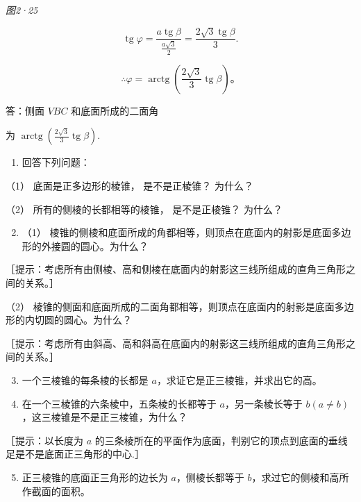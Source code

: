 \emph{图2·25}

\[
\operatorname{tg} \varphi = \frac {a \operatorname{tg} \beta}{\frac {a \sqrt {3}}{2}} = \frac {2 \sqrt {3} \operatorname{tg} \beta}{3}.
\]

\[
\therefore \varphi = \operatorname{arctg} \left(\frac {2 \sqrt {3}}{3} \operatorname{tg} \beta\right)\text{。}
\]

答：侧面 \(VBC\) 和底面所成的二面角

为
\(\operatorname{arctg}\left(\frac{2\sqrt{3}}{3}\operatorname{tg}\beta\right)\).

\begin{enumerate}
\item
  回答下列问题：
\end{enumerate}

（1） 底面是正多边形的棱锥， 是不是正棱锥？ 为什么？

（2） 所有的侧棱的长都相等的棱锥， 是不是正棱锥？ 为什么？

\begin{enumerate}
\setcounter{enumi}{1}
\item
  （1）
  棱锥的侧棱和底面所成的角都相等，则顶点在底面内的射影是底面多边形的外接圆的圆心。为什么？
\end{enumerate}

［提示：考虑所有由侧棱、高和侧棱在底面内的射影这三线所组成的直角三角形之间的关系。］

（2）
棱锥的侧面和底面所成的二面角都相等，则顶点在底面内的射影是底面多边形的内切圆的圆心。为什么？

［提示：考虑所有由斜高、高和斜高在底面内的射影这三线所组成的直角三角形之间的关系。］

\begin{enumerate}
\setcounter{enumi}{2}
\item
  一个三棱锥的每条棱的长都是 \(a\)，求证它是正三棱锥，并求出它的高。
\item
  在一个三棱锥的六条棱中，五条棱的长都等于 \(a\)，另一条棱长等于
  \(b(a \neq b)\)，这三棱锥是不是正三棱锥，为什么？
\end{enumerate}

［提示：以长度为 \(a\)
的三条棱所在的平面作为底面，判别它的顶点到底面的垂线足是不是底面正三角形的中心.］

\begin{enumerate}
\setcounter{enumi}{4}
\item
  正三棱锥的底面正三角形的边长为 \(a\)，侧棱长都等于
  \(b\)，求过它的侧棱和高所作截面的面积。
\end{enumerate}

